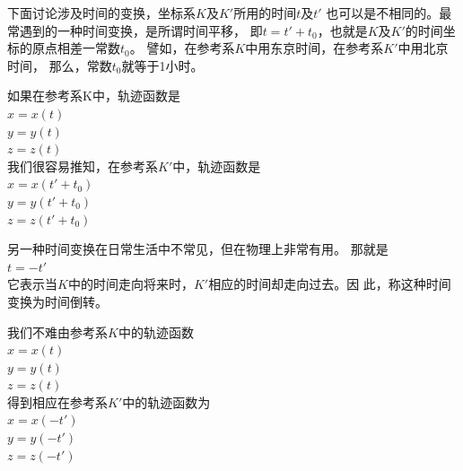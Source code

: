 下面讨论涉及时间的变换，坐标系$K$及$K'$所用的时间$t$及$t'$
也可以是不相同的。最常遇到的一种时间变换，是所谓时间平移，
即$t=t'+t_0$，也就是$K$及$K'$的时间坐标的原点相差一常数$t_0$。
譬如，在参考系$K$中用东京时间，在参考系$K'$中用北京时间，
那么，常数$t_0$就等于1小时。

如果在参考系K中，轨迹函数是\vspace{-0.2em}
\\\null\hspace{6em}$x=x\left(t\right)$
\\\null\hspace{6em}$y=y\left(t\right)$
\\\null\hspace{6em}$z=z\left(t\right)$\\
我们很容易推知，在参考系$K'$中，轨迹函数是\vspace{-0.2em}
\\\null\hspace{6em}$x=x\left(t'+t_0\right)$
\\\null\hspace{6em}$y=y\left(t'+t_0\right)$
\\\null\hspace{6em}$z=z\left(t'+t_0\right)$

另一种时间变换在日常生活中不常见，但在物理上非常有用。
那就是\vspace{-0.5em}
\\\null\hspace{6em}$t=-t'$\\
它表示当$K$中的时间走向将来时，$K'$相应的时间却走向过去。因
此，称这种时间变换为时间倒转。

我们不难由参考系$K$中的轨迹函数\vspace{-0.2em}
\\\null\hspace{6em}$x=x\left(t\right)$
\\\null\hspace{6em}$y=y\left(t\right)$
\\\null\hspace{6em}$z=z\left(t\right)$\\
得到相应在参考系$K'$中的轨迹函数为\vspace{-0.2em}
\\\null\hspace{6em}$x=x\left(-t'\right)$
\\\null\hspace{6em}$y=y\left(-t'\right)$
\\\null\hspace{6em}$z=z\left(-t'\right)$

